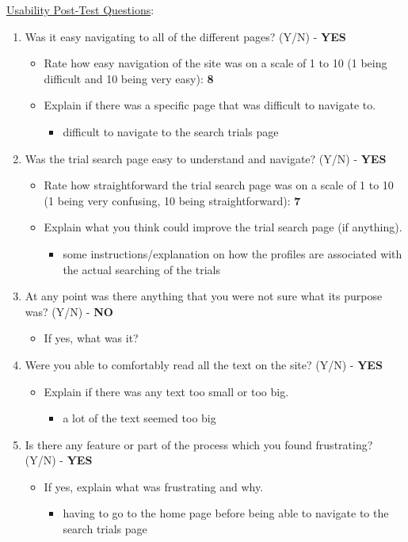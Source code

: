 \documentclass[12pt]{article}
\begin{document}
\noindent \underline{Usability Post-Test Questions}:
\begin{enumerate}
    \item Was it easy navigating to all of the different pages? (Y/N) - \textbf{YES}
      \begin{itemize}
        \item Rate how easy navigation of the site was on a scale of 1 to 10 (1 being difficult and 10 being very easy): \textbf{8}
        \item Explain if there was a specific page that was difficult to navigate to.
        \begin{itemize}
          \item difficult to navigate to the search trials page
        \end{itemize}
      \end{itemize}
      \item Was the trial search page easy to understand and navigate? (Y/N) - \textbf{YES}
      \begin{itemize}
        \item Rate how straightforward the trial search page was on a scale of 1 to 10 (1 being very confusing, 10 being straightforward): \textbf{7}
        \item Explain what you think could improve the trial search page (if anything).
        \begin{itemize}
          \item some instructions/explanation on how the profiles are associated with the actual searching of the trials
        \end{itemize}
      \end{itemize}
    \item At any point was there anything that you were not sure what its purpose was? (Y/N) - \textbf{NO}
      \begin{itemize}
        \item If yes, what was it?
      \end{itemize}
    \item Were you able to comfortably read all the text on the site? (Y/N) - \textbf{YES}
      \begin{itemize}
        \item Explain if there was any text too small or too big.
        \begin{itemize}
          \item a lot of the text seemed too big
        \end{itemize}
      \end{itemize}
    \item  Is there any feature or part of the process which you found frustrating? (Y/N) - \textbf{YES}
      \begin{itemize}
        \item If yes, explain what was frustrating and why.
        \begin{itemize}
          \item having to go to the home page before being able to navigate to the search trials page
        \end{itemize}
      \end{itemize}
  \end{enumerate}
\end{document}
